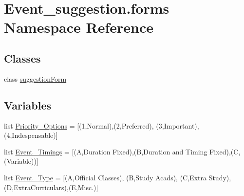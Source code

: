 \hypertarget{namespaceEvent__suggestion_1_1forms}{}\section{Event\+\_\+suggestion.\+forms Namespace Reference}
\label{namespaceEvent__suggestion_1_1forms}
\subsection*{Classes}
\begin{DoxyCompactItemize}
\item 
class \hyperlink{classEvent__suggestion_1_1forms_1_1suggestionForm}{suggestion\+Form}
\end{DoxyCompactItemize}
\subsection*{Variables}
\begin{DoxyCompactItemize}
\item 
list \hyperlink{namespaceEvent__suggestion_1_1forms_ae0ee75286c8408a63046b0fabfc8dd6f}{Priority\+\_\+\+Options} = \mbox{[}(\textquotesingle{}1\textquotesingle{},\textquotesingle{}Normal\textquotesingle{}),(\textquotesingle{}2\textquotesingle{},\textquotesingle{}Preferred\textquotesingle{}), (\textquotesingle{}3\textquotesingle{},\textquotesingle{}Important\textquotesingle{}), (\textquotesingle{}4\textquotesingle{},\textquotesingle{}Indespensable\textquotesingle{})\mbox{]}
\item 
list \hyperlink{namespaceEvent__suggestion_1_1forms_a2800e9ad6984de64ae6ee4ef845b19d1}{Event\+\_\+\+Timings} = \mbox{[}(\textquotesingle{}A\textquotesingle{},\textquotesingle{}Duration Fixed\textquotesingle{}),(\textquotesingle{}B\textquotesingle{},\textquotesingle{}Duration and Timing Fixed\textquotesingle{}),(\textquotesingle{}C\textquotesingle{},(\textquotesingle{}Variable\textquotesingle{}))\mbox{]}
\item 
list \hyperlink{namespaceEvent__suggestion_1_1forms_ad2d5d5802c8d2108ad19611c8b0aae4f}{Event\+\_\+\+Type} = \mbox{[}(\textquotesingle{}A\textquotesingle{},\textquotesingle{}Official Classes\textquotesingle{}), (\textquotesingle{}B\textquotesingle{},\textquotesingle{}Study Acads\textquotesingle{}), (\textquotesingle{}C\textquotesingle{},\textquotesingle{}Extra Study\textquotesingle{}), (\textquotesingle{}D\textquotesingle{},\textquotesingle{}Extra\+Curriculars\textquotesingle{}),(\textquotesingle{}E\textquotesingle{},\textquotesingle{}Misc.\textquotesingle{})\mbox{]}
\end{DoxyCompactItemize}


